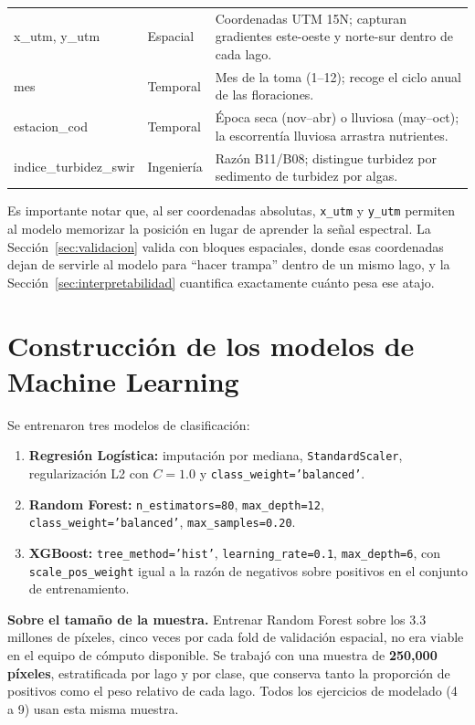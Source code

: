 \documentclass[11pt]{article}
\begin{document}
\begin{table}[H]
\begin{tabular}{p{2.6cm}p{1.8cm}p{8.8cm}}
x\_utm, y\_utm & Espacial & Coordenadas UTM 15N; capturan gradientes este-oeste y norte-sur dentro de cada lago. \\
mes & Temporal & Mes de la toma (1--12); recoge el ciclo anual de las floraciones. \\
estacion\_cod & Temporal & Época seca (nov--abr) o lluviosa (may--oct); la escorrentía lluviosa arrastra nutrientes. \\
indice\_turbidez\_\newline swir & Ingeniería & Razón B11/B08; distingue turbidez por sedimento de turbidez por algas. \\
\bottomrule
\end{tabular}
\end{table}

Es importante notar que, al ser coordenadas absolutas, \texttt{x\_utm} y \texttt{y\_utm} permiten al modelo memorizar la posición en lugar de aprender la señal espectral. La Sección~\ref{sec:validacion} valida con bloques espaciales, donde esas coordenadas dejan de servirle al modelo para ``hacer trampa'' dentro de un mismo lago, y la Sección~\ref{sec:interpretabilidad} cuantifica exactamente cuánto pesa ese atajo.

\section{Construcción de los modelos de Machine Learning}
\label{sec:modelos}

Se entrenaron tres modelos de clasificación:

\begin{enumerate}
    \item \textbf{Regresión Logística:} imputación por mediana, \texttt{StandardScaler}, regularización L2 con \(C=1.0\) y \texttt{class\_weight='balanced'}.
    \item \textbf{Random Forest:} \texttt{n\_estimators=80}, \texttt{max\_depth=12}, \texttt{class\_weight='balanced'}, \texttt{max\_samples=0.20}.
    \item \textbf{XGBoost:} \texttt{tree\_method='hist'}, \texttt{learning\_rate=0.1}, \texttt{max\_depth=6}, con \texttt{scale\_pos\_weight} igual a la razón de negativos sobre positivos en el conjunto de entrenamiento.
\end{enumerate}

\textbf{Sobre el tamaño de la muestra.} Entrenar Random Forest sobre los 3.3 millones de píxeles, cinco veces por cada fold de validación espacial, no era viable en el equipo de cómputo disponible. Se trabajó con una muestra de \textbf{250{,}000 píxeles}, estratificada por lago y por clase, que conserva tanto la proporción de positivos como el peso relativo de cada lago. Todos los ejercicios de modelado (4 a 9) usan esta misma muestra.
\end{document}
